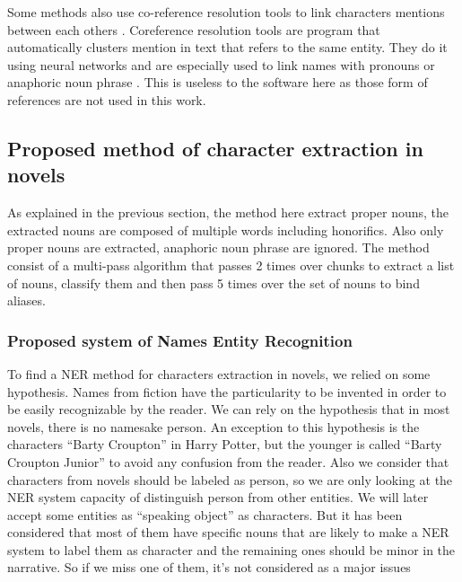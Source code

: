 \documentclass[a4paper, 12pt]{report}
\begin{document}
Some methods also use co-reference resolution tools to link characters mentions between each others \citep{character_meta}. Coreference resolution tools are program that automatically clusters mention in text that refers to the same entity. They do it using neural networks and are especially used to link names with pronouns or anaphoric noun phrase \citep{coref_deep, coref_deep2} . This is useless to the software here as those form of references are not used in this work. \\

\subsection{Proposed method of character extraction in novels}
As explained in the previous section, the method here extract proper nouns, the extracted nouns are composed of multiple words including honorifics. Also only proper nouns are extracted, anaphoric noun phrase are ignored. The method consist of a multi-pass algorithm that passes 2 times over chunks to extract a list of nouns,  classify them and then pass 5 times over the set of nouns to bind aliases.
\subsubsection{Proposed system of Names Entity Recognition}
\label{section:NER}
To find a NER method for characters extraction in novels, we relied on some hypothesis. Names from fiction have the particularity to be invented in order to be easily recognizable by the reader. We can rely on the hypothesis that in most novels, there is no namesake person. An exception to this hypothesis is the characters ``Barty Croupton'' in Harry Potter, but the younger is called ``Barty Croupton Junior'' to avoid any confusion from the reader. Also we consider that characters from novels should be labeled as person, so we are only looking at the  NER system capacity of distinguish person from other entities. We will later accept some entities as ``speaking object'' as characters. But it has been considered that most of them have specific nouns that are likely to make a NER system to label them as character and the remaining ones should be minor in the narrative. So if we miss one of them, it's not considered as a major issues\\
\end{document}
